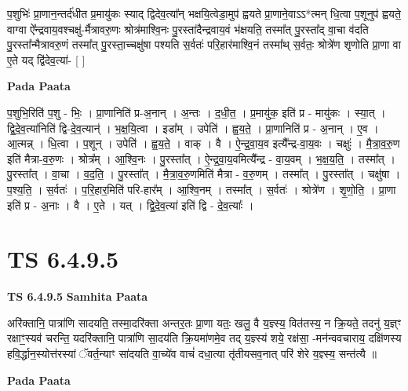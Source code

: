 \documentclass[17pt]{extarticle}
\begin{document}
प॒शुभिः॑ प्रा॒णान॒न्तर्द॑धीत प्र॒मायु॑कः स्याद् द्विदेव॒त्या᳚न् भक्षयि॒त्वेडा॒मुप॑ ह्वयते प्रा॒णाने॒वाऽऽ*त्मन् धि॒त्वा प॒शूनुप॑ ह्वयते॒ वाग्वा ऐ᳚न्द्रवाय॒वश्चक्षु॑-र्मैत्रावरु॒णः श्रोत्र॑माश्वि॒नः पु॒रस्ता॑दैन्द्रवाय॒वं भ॑क्षयति॒ तस्मा᳚त् पु॒रस्ता᳚द् वा॒चा व॑दति पु॒रस्ता᳚न्मैत्रावरु॒णं तस्मा᳚त् पु॒रस्ता॒च्चक्षु॑षा पश्यति स॒र्वतः॑ परि॒हार॑माश्वि॒नं तस्मा᳚थ् स॒र्वतः॒ श्रोत्रे॑ण शृणोति प्रा॒णा वा ए॒ते यद् द्वि॑देव॒त्या॑- [  ] \newline

\textbf{Pada Paata} \newline

प॒शुभि॒रिति॑ प॒शु - भिः॒ । प्रा॒णानिति॑ प्र-अ॒नान् । अ॒न्तः । द॒धी॒त॒ । प्र॒मायु॑क॒ इति॑ प्र - मायु॑कः । स्या॒त् । द्वि॒दे॒व॒त्या॑निति॑ द्वि-दे॒व॒त्यान्॑ । भ॒क्ष॒यि॒त्वा । इडा᳚म् । उपेति॑ । ह्व॒य॒ते॒ । प्रा॒णानिति॑ प्र - अ॒नान् । ए॒व । आ॒त्मन्न् । धि॒त्वा । प॒शून् । उपेति॑ । ह्व॒य॒ते॒ । वाक् । वै । ऐ॒न्द्र॒वा॒य॒व इत्यै᳚न्द्र-वा॒य॒वः । चक्षुः॑ । मै॒त्रा॒व॒रु॒ण इति॑ मैत्रा-व॒रु॒णः । श्रोत्र᳚म् । आ॒श्वि॒नः । पु॒रस्ता᳚त् । ऐ॒न्द्र॒वा॒य॒वमित्यै᳚न्द्र - वा॒य॒वम् । भ॒क्ष॒य॒ति॒ । तस्मा᳚त् । पु॒रस्ता᳚त् । वा॒चा । व॒द॒ति॒ । पु॒रस्ता᳚त् । मै॒त्रा॒व॒रु॒णमिति॑ मैत्रा - व॒रु॒णम् । तस्मा᳚त् । पु॒रस्ता᳚त् । चक्षु॑षा । प॒श्य॒ति॒ । स॒र्वतः॑ । प॒रि॒हार॒मिति॑ परि-हार᳚म् । आ॒श्वि॒नम् । तस्मा᳚त् । स॒र्वतः॑ । श्रोत्रे॑ण । शृ॒णो॒ति॒ । प्रा॒णा इति॑ प्र - अ॒नाः । वै । ए॒ते । यत् । द्वि॒दे॒व॒त्या॑ इति॑ द्वि - दे॒व॒त्याः᳚ ।  \newline




\section*{ TS 6.4.9.5 }

\textbf{TS 6.4.9.5 } \newline
\textbf{Samhita Paata} \newline

अरि॑क्तानि॒ पात्रा॑णि सादयति॒ तस्मा॒दरि॑क्ता अन्तर॒तः प्रा॒णा यतः॒ खलु॒ वै य॒ज्ञ्स्य॒ वित॑तस्य॒ न क्रि॒यते॒ तदनु॑ य॒ज्ञ्ꣳ रक्षाꣳ॒॒स्यव॑ चरन्ति॒ यदरि॑क्तानि॒ पात्रा॑णि सा॒दय॑ति क्रि॒यमा॑णमे॒व तद् य॒ज्ञ्स्य॑ शये॒ रक्ष॑सा॒ -मन॑न्ववचाराय॒ दक्षि॑णस्य हवि॒र्द्धान॒स्योत्त॑रस्यां ॅवर्त॒न्याꣳ सा॑दयति वा॒च्ये॑व वाचं॑ दधा॒त्या तृ॑तीयसव॒नात् परि॑ शेरे य॒ज्ञ्स्य॒ सन्त॑त्यै ॥ \newline

\textbf{Pada Paata} \newline
\end{document}
